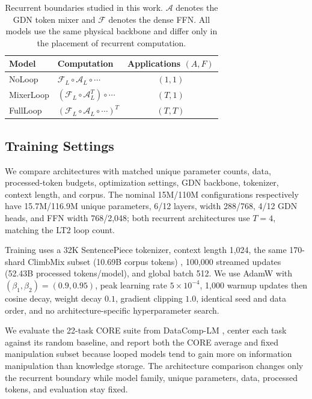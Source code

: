\documentclass{article}
\newcommand{\Aop}{\mathcal{A}}
\newcommand{\Fop}{\mathcal{F}}
\begin{document}
\begin{table}[t]
\centering
\small
\setlength{\tabcolsep}{2pt}
\begin{tabular}{@{}llc@{}}
\toprule
Model & Computation & Applications $(A,F)$ \\
\midrule
NoLoop
&
$\Fop_L\!\circ\!\Aop_L\!\circ\!\cdots$
&
$(1,1)$
\\
MixerLoop
&
$(\Fop_L\!\circ\!\Aop_L^T)\!\circ\!\cdots$
&
$(T,1)$
\\
FullLoop
&
$(\Fop_L\!\circ\!\Aop_L\!\circ\!\cdots)^T$
&
$(T,T)$
\\
\bottomrule
\end{tabular}
\caption{Recurrent boundaries studied in this work. $\Aop$ denotes the GDN
token mixer and $\Fop$ denotes the dense FFN. All models use the same physical
backbone and differ only in the placement of recurrent computation.}
\label{tab:architecture}
\end{table}

\subsection{Training Settings}

We compare architectures with matched unique parameter counts, data,
processed-token budgets, optimization settings, GDN backbone, tokenizer, context length,
and corpus. The nominal 15M/110M configurations respectively have
15.7M/116.9M unique parameters, 6/12 layers, width 288/768, 4/12 GDN heads, and
FFN width 768/2,048; both recurrent architectures use $T=4$, matching the LT2
loop count.

Training uses a 32K SentencePiece tokenizer, context length 1,024, the same
170-shard ClimbMix subset (10.69B corpus tokens) \cite{diao2026nemotronclimb},
100,000 streamed updates (52.43B processed tokens/model), and global batch
512. We use AdamW with $(\beta_1,\beta_2)=(0.9,0.95)$, peak learning rate
$5\times10^{-4}$, 1,000 warmup updates then cosine decay, weight decay $0.1$,
gradient clipping $1.0$, identical seed and data order, and no
architecture-specific hyperparameter search.

We evaluate the 22-task CORE suite from DataComp-LM
\cite{li2025datacomplmsearchgenerationtraining}, center each task against its
random baseline, and report both the CORE average and fixed manipulation subset
because looped models tend to gain more on information manipulation than
knowledge storage. The architecture comparison changes only the recurrent
boundary while model family, unique parameters, data, processed tokens, and
evaluation stay fixed.
\end{document}
